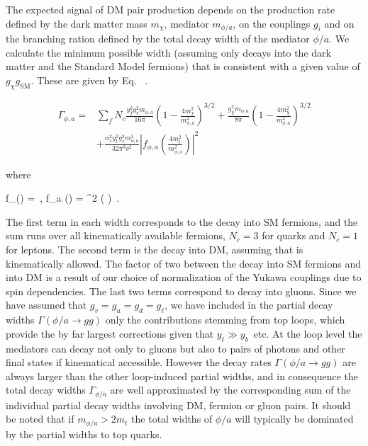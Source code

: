 The expected signal of DM pair production depends on the production rate defined by the dark matter mass $m_\chi$, mediator $m_{\phi/a}$, on the couplings $g_i$ and on the branching ration defined by the total decay width of the mediator $\phi/a$. We calculate the minimum possible width (assuming only decays into the dark matter and the Standard Model fermions) that is consistent with a given value of $g_\chi g_\textrm{SM}$. These are given by Eq.~ \cite{Buckley:2014fba}. 

\begin{equation} \label{eq:width}
\begin{split}
\Gamma_{\phi,a}  = & \sum_f N_c \frac{y_f^2 g_v^2 m_{\phi,a}}{16 \pi} \left(1-\frac{4 m_f^2}{m_{\phi,a}^2}\right)^{3/2}
                   + \frac{g_\chi^2 m_{\phi,a}}{8 \pi} \left(1-\frac{4 m_\chi^2}{m_{\phi,a}^2}\right)^{3/2}\\
                 & + \frac{\alpha_s^2 y_t^2 g_v^2 m_{\phi,a}^3}{32 \pi^3 v^2} \left| f_{\phi,a}\left(\tfrac{4m_t^2}{m_{\phi,a}^2} \right)\right|^2
\end{split}
\end{equation}

where

\bea \label{eq:fphifa}
f_\phi (\tau) = \tau {}  \,, \qquad 
f_a (\tau) =  \tau \arctan^2 \left (  \right ) \,. 
\eea

The first term in each width corresponds to the decay into SM fermions, and the sum runs over all kinematically available fermions, $N_c = 3$ for quarks and $N_c = 1$ for leptons. The second term is the decay into DM, assuming that is kinematically allowed. The factor of two between the decay into SM  fermions and into DM  is a result of our choice of normalization of the Yukawa couplings due to spin dependencies. The last two terms correspond to decay into gluons.  Since we have assumed that $g_v = g_u = g_d = g_\ell$, we have included in the partial decay widths $\Gamma (\phi/a \to gg)$ only the contributions stemming from top loops, which provide the by far largest corrections given that $y_t \gg y_b$~etc. At the loop level the mediators can decay not only to gluons but also to pairs of photons and other final states if kinematical accessible. However the decay rates $\Gamma (\phi/a \to gg)$ are always larger than the other loop-induced partial widths, and in consequence the total decay widths $\Gamma_{\phi/a}$ are well approximated by the corresponding sum of the individual partial decay widths involving DM, fermion or gluon pairs. It should be noted that if  $m_{\phi/a} > 2m_t$ the total widths of $\phi/a$ will typically be dominated by the partial widths to top quarks.

